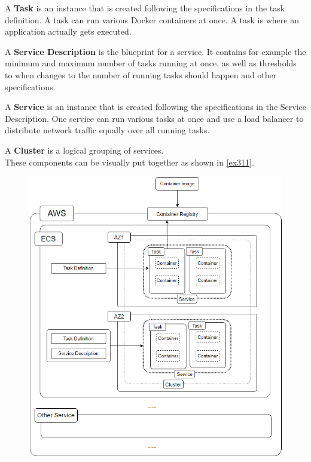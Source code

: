 A \textbf{Task} is an instance that is created following the specifications in the task definition. A task can run various Docker containers at once. A task is where an application actually gets executed.

A \textbf{Service Description} is the blueprint for a service. It contains for example the minimum and maximum number of tasks running at once, as well as thresholds to when changes to the number of running tasks should happen and other specifications.

A \textbf{Service} is an instance that is created following the specifications in the Service Description. One service can run various tasks at once and use a load balancer to distribute network traffic equally over all running tasks.

A \textbf{Cluster} is a logical grouping of services. \\

These components can be visually put together as shown in \autoref{ex311}. \citep[with adaptions]{AwsEcs} \\

\begin{figure}[h]
\centering
\includegraphics[scale=.8]{Bilder/EcsStructure.png}
\label{ex311}
\end{figure}

